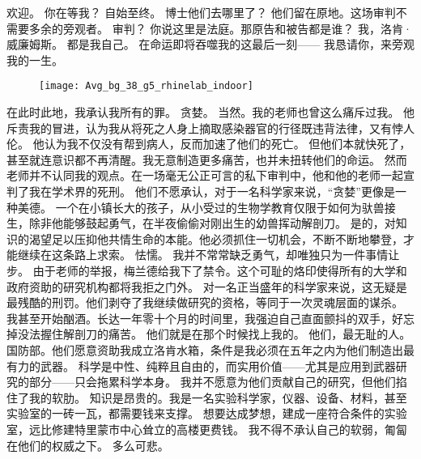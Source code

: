\documentclass[openany]{book}
\begin{document}
\begin{dialogue}
     欢迎。
     你在等我？
     自始至终。
     博士他们去哪里了？
     他们留在原地。这场审判不需要多余的旁观者。
     审判？
     你说这里是法庭。那原告和被告都是谁？
     我，洛肯·威廉姆斯。
     都是我自己。
     在命运即将吞噬我的这最后一刻——
     我恳请你，来旁观我的一生。
    \begin{figure}[h]
        \centering
        \texttt{[image: Avg\_bg\_38\_g5\_rhinelab\_indoor]}
    \end{figure}
     在此时此地，我承认我所有的罪。
     贪婪。
     当然。我的老师也曾这么痛斥过我。
     他斥责我的冒进，认为我从将死之人身上摘取感染器官的行径既违背法律，又有悖人伦。
     他认为我不仅没有帮到病人，反而加速了他们的死亡。
     但他们本就快死了，甚至就连意识都不再清醒。我无意制造更多痛苦，也并未扭转他们的命运。
     然而老师并不认同我的观点。在一场毫无公正可言的私下审判中，他和他的老师一起宣判了我在学术界的死刑。
     他们不愿承认，对于一名科学家来说，“贪婪”更像是一种美德。
     一个在小镇长大的孩子，从小受过的生物学教育仅限于如何为驮兽接生，除非他能够鼓起勇气，在半夜偷偷对刚出生的幼兽挥动解剖刀。
     是的，对知识的渴望足以压抑他共情生命的本能。他必须抓住一切机会，不断不断地攀登，才能继续在这条路上求索。
     怯懦。
     我并不常常缺乏勇气，却唯独只为一件事情让步。
     由于老师的举报，梅兰德给我下了禁令。这个可耻的烙印使得所有的大学和政府资助的研究机构都将我拒之门外。
     对一名正当盛年的科学家来说，这无疑是最残酷的刑罚。他们剥夺了我继续做研究的资格，等同于一次灵魂层面的谋杀。
     我甚至开始酗酒。长达一年零十个月的时间里，我强迫自己直面颤抖的双手，好忘掉没法握住解剖刀的痛苦。
     他们就是在那个时候找上我的。
     他们，最无耻的人。
     国防部。他们愿意资助我成立洛肯水箱，条件是我必须在五年之内为他们制造出最有力的武器。
     科学是中性、纯粹且自由的，而实用价值——尤其是应用到武器研究的部分——只会拖累科学本身。
     我并不愿意为他们贡献自己的研究，但他们掐住了我的软肋。
     知识是昂贵的。我是一名实验科学家，仪器、设备、材料，甚至实验室的一砖一瓦，都需要钱来支撑。
     想要达成梦想，建成一座符合条件的实验室，远比修建特里蒙市中心耸立的高楼更费钱。
     我不得不承认自己的软弱，匍匐在他们的权威之下。
     多么可悲。

\end{dialogue}
\end{document}
